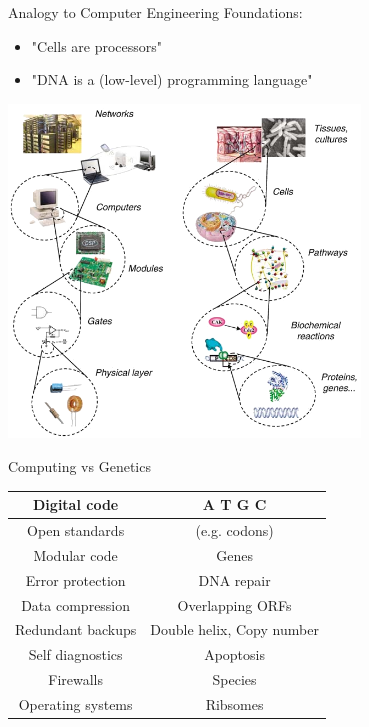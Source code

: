 \begin{frame}{Analogy to Computer Engineering}
\footnotesize
Foundations:
\begin{itemize}
\footnotesize
\item "Cells are processors"
\item "DNA is a (low-level) programming language"
\end{itemize}
\begin{center}
\includegraphics[width=0.7\textwidth]{./images/SynBio_ComputerEngineering.png} 
\end{center}

\end{frame}
\begin{frame}{Computing vs Genetics}
\footnotesize
\begin{center}
\begin{tabular}{c | c}
        Digital code  & A T G C \\ \hline
        Open standards & (e.g. codons) \\ \hline
        Modular code  & Genes\\ \hline
        Error protection  & DNA repair\\ \hline
        Data compression  & Overlapping ORFs\\ \hline
        Redundant backups  & Double helix, Copy number\\ \hline
        Self diagnostics & Apoptosis\\ \hline
        Firewalls & Species\\ \hline
        Operating systems & Ribsomes\\ 
\end{tabular}
\end{center}

\end{frame}
